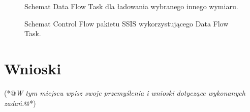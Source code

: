 \documentclass[a4paper,12pt]{article}
\begin{document}
\begin{figure}[H]
    \centering
    \caption{Schemat Data Flow Task dla ładowania wybranego innego wymiaru.}
    \label{fig:zad5_dft_other_dim}
\end{figure}

\begin{figure}[H]
    \centering
    \caption{Schemat Control Flow pakietu SSIS wykorzystującego Data Flow Task.}
    \label{fig:zad5_control_flow}
\end{figure}

\section{Wnioski}

 (*@\textit{W tym miejscu wpisz swoje przemyślenia i wnioski dotyczące wykonanych zadań.}@*)



\printbibliography
\end{document}
